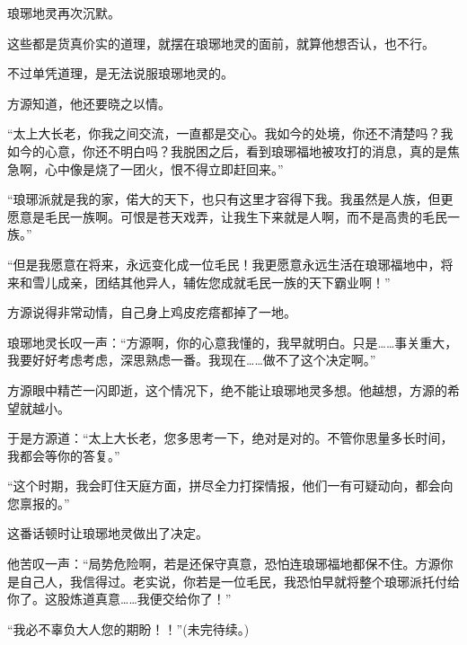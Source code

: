 \begin{this_body}
琅琊地灵再次沉默。

这些都是货真价实的道理，就摆在琅琊地灵的面前，就算他想否认，也不行。

不过单凭道理，是无法说服琅琊地灵的。

方源知道，他还要晓之以情。

“太上大长老，你我之间交流，一直都是交心。我如今的处境，你还不清楚吗？我如今的心意，你还不明白吗？我脱困之后，看到琅琊福地被攻打的消息，真的是焦急啊，心中像是烧了一团火，恨不得立即赶回来。”

“琅琊派就是我的家，偌大的天下，也只有这里才容得下我。我虽然是人族，但更愿意是毛民一族啊。可恨是苍天戏弄，让我生下来就是人啊，而不是高贵的毛民一族。”

“但是我愿意在将来，永远变化成一位毛民！我更愿意永远生活在琅琊福地中，将来和雪儿成亲，团结其他异人，辅佐您成就毛民一族的天下霸业啊！”

方源说得非常动情，自己身上鸡皮疙瘩都掉了一地。

琅琊地灵长叹一声：“方源啊，你的心意我懂的，我早就明白。只是……事关重大，我要好好考虑考虑，深思熟虑一番。我现在……做不了这个决定啊。”

方源眼中精芒一闪即逝，这个情况下，绝不能让琅琊地灵多想。他越想，方源的希望就越小。

于是方源道：“太上大长老，您多思考一下，绝对是对的。不管你思量多长时间，我都会等你的答复。”

“这个时期，我会盯住天庭方面，拼尽全力打探情报，他们一有可疑动向，都会向您禀报的。”

这番话顿时让琅琊地灵做出了决定。

他苦叹一声：“局势危险啊，若是还保守真意，恐怕连琅琊福地都保不住。方源你是自己人，我信得过。老实说，你若是一位毛民，我恐怕早就将整个琅琊派托付给你了。这股炼道真意……我便交给你了！”

“我必不辜负大人您的期盼！！”(未完待续。)

\end{this_body}

